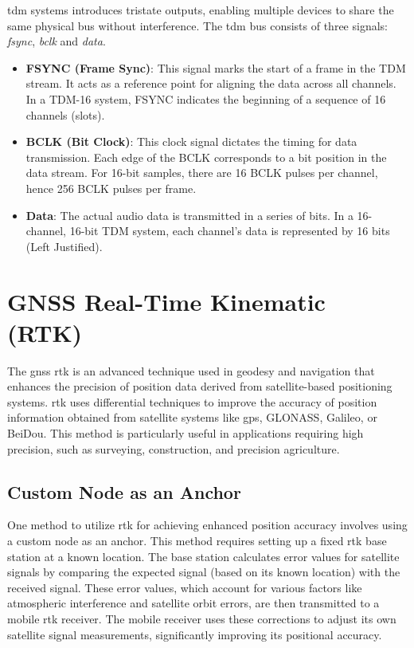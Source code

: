 \acrfull{tdm} systems introduces tristate outputs, enabling multiple devices to share the same physical bus without interference.
The \acrshort{tdm} bus consists of three signals: \textit{fsync}, \textit{bclk} and \textit{data}.
\begin{itemize}
	\item \textbf{FSYNC (Frame Sync)}: This signal marks the start of a frame in the TDM stream.
	      It acts as a reference point for aligning the data across all channels.
	      In a TDM-16 system, FSYNC indicates the beginning of a sequence of 16 channels (slots).
	\item \textbf{BCLK (Bit Clock)}: This clock signal dictates the timing for data transmission.
	      Each edge of the BCLK corresponds to a bit position in the data stream.
	      For 16-bit samples, there are 16 BCLK pulses per channel, hence 256 BCLK pulses per frame.
	\item \textbf{Data}: The actual audio data is transmitted in a series of bits.
	      In a 16-channel, 16-bit TDM system, each channel's data is represented by 16 bits (Left Justified).
\end{itemize}
\clearpage

\section{GNSS Real-Time Kinematic (RTK)}
The \acrfull{gnss} \acrfull{rtk} is an advanced technique used in geodesy and navigation
that enhances the precision of position data derived from satellite-based positioning systems.
\acrshort{rtk} uses differential techniques to improve the accuracy of position information obtained from satellite systems like
\acrshort{gps}, GLONASS, Galileo, or BeiDou.
This method is particularly useful in applications requiring high precision,
such as surveying, construction, and precision agriculture.

\subsection{Custom Node as an Anchor}
One method to utilize \acrshort{rtk} for achieving enhanced position accuracy involves using a custom node as an anchor.
This method requires setting up a fixed \acrshort{rtk} base station at a known location.
The base station calculates error values for satellite signals by comparing the expected signal (based on its known location) with the received signal.
These error values, which account for various factors like atmospheric interference and satellite orbit errors,
are then transmitted to a mobile \acrshort{rtk} receiver.
The mobile receiver uses these corrections to adjust its own satellite signal measurements, significantly improving its positional accuracy.

